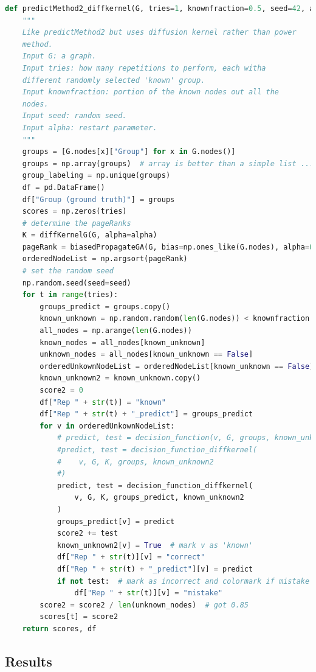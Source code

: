 \begin{lstlisting}[language=python]
def predictMethod2_diffkernel(G, tries=1, knownfraction=0.5, seed=42, alpha=0.2):
    """
    Like predictMethod2 but uses diffusion kernel rather than power
    method.
    Input G: a graph.
    Input tries: how many repetitions to perform, each witha
    different randomly selected 'known' group.
    Input knownfraction: portion of the known nodes out all the
    nodes.
    Input seed: random seed.
    Input alpha: restart parameter.
    """
    groups = [G.nodes[x]["Group"] for x in G.nodes()]
    groups = np.array(groups)  # array is better than a simple list ...
    group_labeling = np.unique(groups)
    df = pd.DataFrame()
    df["Group (ground truth)"] = groups
    scores = np.zeros(tries)
    # determine the pageRanks
    K = diffKernelG(G, alpha=alpha)
    pageRank = biasedPropagateGA(G, bias=np.ones_like(G.nodes), alpha=0.2)
    orderedNodeList = np.argsort(pageRank)
    # set the random seed
    np.random.seed(seed=seed)
    for t in range(tries):
        groups_predict = groups.copy()
        known_unknown = np.random.random(len(G.nodes)) < knownfraction  # known=1
        all_nodes = np.arange(len(G.nodes))
        known_nodes = all_nodes[known_unknown]
        unknown_nodes = all_nodes[known_unknown == False]
        orderedUnkownNodeList = orderedNodeList[known_unknown == False]
        known_unknown2 = known_unknown.copy()
        score2 = 0
        df["Rep " + str(t)] = "known"
        df["Rep " + str(t) + "_predict"] = groups_predict
        for v in orderedUnkownNodeList:
            # predict, test = decision_function(v, G, groups, known_unknown2, alpha=alpha)
            #predict, test = decision_function_diffkernel(
            #    v, G, K, groups, known_unknown2
            #)
            predict, test = decision_function_diffkernel(
                v, G, K, groups_predict, known_unknown2
            )
            groups_predict[v] = predict
            score2 += test
            known_unknown2[v] = True  # mark v as 'known'
            df["Rep " + str(t)][v] = "correct"
            df["Rep " + str(t) + "_predict"][v] = predict
            if not test:  # mark as incorrect and colormark if mistake
                df["Rep " + str(t)][v] = "mistake"
        score2 = score2 / len(unknown_nodes)  # got 0.85
        scores[t] = score2
    return scores, df
\end{lstlisting}

\subsection{Results}

